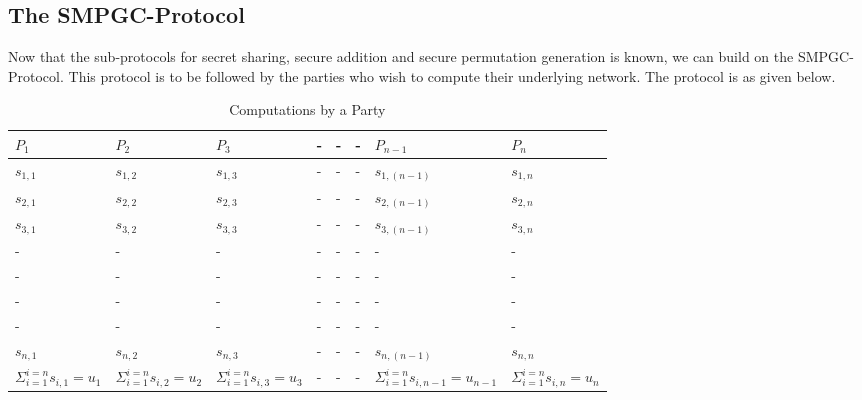\documentclass{llncs}
\begin{document}
\subsection{The SMPGC-Protocol}
Now that the sub-protocols for secret sharing, secure addition and secure permutation generation is known, we can build on the SMPGC-Protocol. This protocol is to be followed by the parties who wish to compute their underlying network. The protocol is as given below.
\begin{table*}[t]
\label{table: Computations}
\centering
\caption{Computations by a Party }
\begin{tabular}{|l|l|l|l|l|l|l|l|}
\hline
$P_1$ & $P_2$ & $P_3$ & - & - & - & $P_{n-1}$ & $P_n$\\ \hline
\hline
$s_{1,1}$ & $s_{1,2}$ & $s_{1,3}$ & - & - & - & $s_{1,(n-1)}$ & $s_{1,n}$\\ \hline
$s_{2,1}$ & $s_{2,2}$ & $s_{2,3}$ & - & - & - & $s_{2,(n-1)}$ & $s_{2,n}$\\ \hline
$s_{3,1}$ & $s_{3,2}$ & $s_{3,3}$ & - & - & - & $s_{3,(n-1)}$ & $s_{3,n}$\\ \hline 
- & - & - & - & - & - & - & -\\ \hline
- & - & - & - & - & - & - & -\\ \hline
- & - & - & - & - & - & - & -\\ \hline
- & - & - & - & - & - & - & -\\ \hline
$s_{n,1}$ & $s_{n,2}$ & $s_{n,3}$ & - & - & - & $s_{n,(n-1)}$ & $s_{n,n}$\\ \hline 
$\Sigma_{i=1}^{i=n}s_{i,1}=u_1$ & $\Sigma_{i=1}^{i=n}s_{i,2}=u_2$ & $\Sigma_{i=1}^{i=n}s_{i,3}=u_3$ & - & - & - & $\Sigma_{i=1}^{i=n}s_{i,n-1}=u_{n-1}$ & $\Sigma_{i=1}^{i=n}s_{i,n}=u_n$\\ \hline 
\end{tabular}
\label{table:example}
\end{table*}
\end{document}
